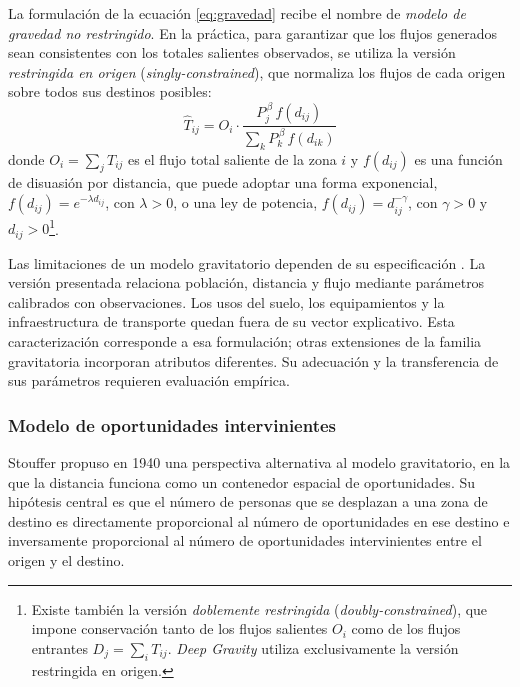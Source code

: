 La formulación de la ecuación \eqref{eq:gravedad} recibe el nombre de \textit{modelo de gravedad no restringido}. En la práctica, para garantizar que los flujos generados sean consistentes con los totales salientes observados, se utiliza la versión \textit{restringida en origen} (\textit{singly-constrained}), que normaliza los flujos de cada origen sobre todos sus destinos posibles:
\begin{equation}
    \hat{T}_{ij} = O_i \cdot \frac{P_j^{\,\beta}\, f(d_{ij})}{\displaystyle\sum_{k} P_k^{\,\beta}\, f(d_{ik})}
    \label{eq:gravedad_restringida}
\end{equation}
donde $O_i = \sum_j T_{ij}$ es el flujo total saliente de la zona $i$ y $f(d_{ij})$ es una función de disuasión por distancia, que puede adoptar una forma exponencial, $f(d_{ij})=e^{-\lambda d_{ij}}$, con $\lambda>0$, o una ley de potencia, $f(d_{ij})=d_{ij}^{-\gamma}$, con $\gamma>0$ y $d_{ij}>0$\footnote{Existe también la versión \textit{doblemente restringida} (\textit{doubly-constrained}), que impone conservación tanto de los flujos salientes $O_i$ como de los flujos entrantes $D_j = \sum_i T_{ij}$. \textit{Deep Gravity} utiliza exclusivamente la versión restringida en origen.}.

Las limitaciones de un modelo gravitatorio dependen de su especificación \cite{liu2024interdisciplinary}. La versión presentada relaciona población, distancia y flujo mediante parámetros calibrados con observaciones. Los usos del suelo, los equipamientos y la infraestructura de transporte quedan fuera de su vector explicativo. Esta caracterización corresponde a esa formulación; otras extensiones de la familia gravitatoria incorporan atributos diferentes. Su adecuación y la transferencia de sus parámetros requieren evaluación empírica.

\subsubsection{Modelo de oportunidades intervinientes}

Stouffer \cite{stouffer1940intervening} propuso en 1940 una perspectiva alternativa al modelo gravitatorio, en la que la distancia funciona como un contenedor espacial de oportunidades. Su hipótesis central es que el número de personas que se desplazan a una zona de destino es directamente proporcional al número de oportunidades en ese destino e inversamente proporcional al número de oportunidades intervinientes entre el origen y el destino.

